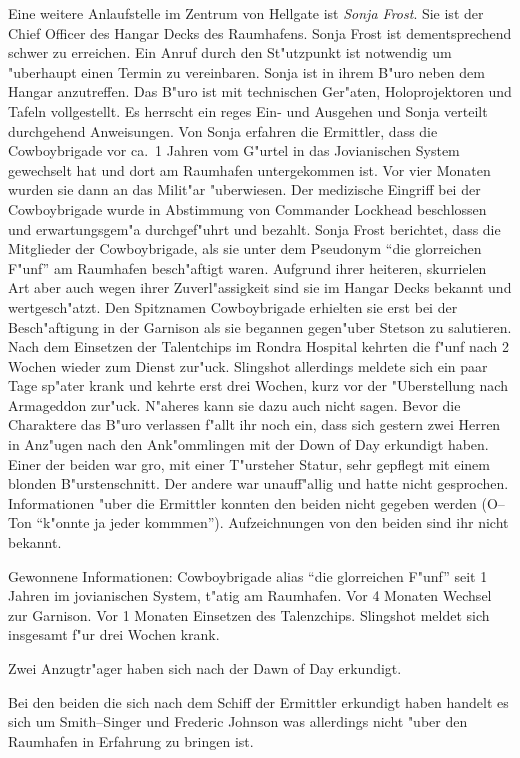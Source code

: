 Eine weitere Anlaufstelle im Zentrum von Hellgate ist \emph{Sonja Frost}. Sie ist der Chief Officer des Hangar Decks des Raumhafens. Sonja Frost ist dementsprechend schwer zu erreichen. Ein Anruf durch den St"utzpunkt ist notwendig um "uberhaupt einen Termin zu vereinbaren. Sonja ist in ihrem B"uro neben dem Hangar anzutreffen. Das B"uro ist mit technischen Ger"aten, Holoprojektoren und Tafeln vollgestellt. Es herrscht ein reges Ein- und Ausgehen und Sonja verteilt durchgehend Anweisungen. Von Sonja erfahren die Ermittler, dass die Cowboybrigade vor ca.~1 Jahren vom G"urtel in das Jovianischen System gewechselt hat und dort am Raumhafen untergekommen ist. Vor vier Monaten wurden sie dann an das Milit"ar "uberwiesen. Der medizische Eingriff bei der Cowboybrigade wurde in Abstimmung von Commander Lockhead beschlossen und erwartungsgem"a\3 durchgef"uhrt und bezahlt. Sonja Frost berichtet, dass die Mitglieder der Cowboybrigade, als sie unter dem Pseudonym "`die glorreichen F"unf"' am Raumhafen besch"aftigt waren. Aufgrund ihrer heiteren, skurrielen Art aber auch wegen ihrer Zuverl"assigkeit sind sie im Hangar Decks bekannt und wertgesch"atzt.  Den Spitznamen Cowboybrigade erhielten sie erst bei der Besch"aftigung in der Garnison als sie begannen gegen"uber Stetson zu salutieren. Nach dem Einsetzen der Talentchips im Rondra Hospital kehrten die f"unf nach 2 Wochen wieder zum Dienst zur"uck. Slingshot allerdings meldete sich ein paar Tage sp"ater krank und kehrte erst drei Wochen, kurz vor der "Uberstellung nach Armageddon zur"uck. N"aheres kann sie dazu auch nicht sagen. Bevor die Charaktere das B"uro verlassen f"allt ihr noch ein, dass sich gestern zwei Herren in Anz"ugen nach den Ank"ommlingen mit der Down of Day erkundigt haben. Einer der beiden war gro\3, mit einer T"ursteher Statur, sehr gepflegt mit einem blonden B"urstenschnitt. Der andere war unauff"allig und hatte nicht gesprochen. Informationen "uber die Ermittler konnten den beiden nicht gegeben werden (O--Ton "`k"onnte ja jeder kommmen"'). Aufzeichnungen von den beiden sind ihr nicht bekannt.


\begin{remarks}
	Gewonnene Informationen: Cowboybrigade alias "`die glorreichen F"unf"' seit 1 Jahren im jovianischen System, t"atig am Raumhafen. Vor 4 Monaten Wechsel zur Garnison. Vor 1 Monaten Einsetzen des Talenzchips. Slingshot meldet sich insgesamt f"ur drei Wochen krank. 
	
	Zwei Anzugtr"ager haben sich nach der Dawn of Day erkundigt.

	Bei den beiden die sich nach dem Schiff der Ermittler erkundigt haben handelt es sich um Smith--Singer und Frederic Johnson was allerdings nicht "uber den Raumhafen in Erfahrung zu bringen ist.
\end{remarks}


